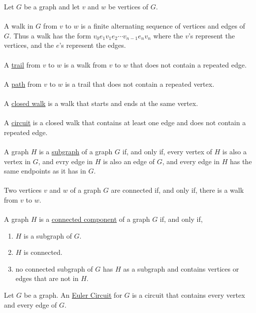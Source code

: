 \documentclass{report}
\begin{document}
Let $G$ be a graph and let $v$ and $w$ be vertices of $G$.\\\\
A walk in $G$ from $v$ to $w$ is a finite alternating sequence of vertices and edges of $G$. Thus a walk has the form $v_{0}e_{1}v_{1}e_{2}\cdots v_{n-1}e_{n}v_{n}$ where the $v$'s represent the vertices, and the $e$'s represent the edges.\\\\
A \underline{trail} from $v$ to $w$ is a walk from $v$ to $w$ that does not contain a repeated edge.\\\\
A \underline{path} from $v$ to $w$ is a trail that does not contain a repeated vertex.\\\\
A \underline{closed walk} is a walk that starts and ends at the same vertex.\\\\
A \underline{circuit} is a closed walk that contains at least one edge and does not contain a repeated edge.\\\\
A graph $H$ is a \underline{subgraph} of a graph $G$ if, and only if, every vertex of $H$ is also a vertex in $G$, and evry edge in $H$ is also an edge of $G$, and every edge in $H$ has the same endpoints as it has in $G$.\\\\
Two vertices $v$ and $w$ of a graph $G$ are connected if, and only if, there is a walk from $v$ to $w$.\\\\
A graph $H$ is a \underline{connected component} of a graph $G$ if, and only if,
\begin{enumerate}
    \item  $H$ is a subgraph of $G$.
    \item  $H$ is connected. 
    \item  no connected subgraph of $G$ has $H$ as a subgraph and contains vertices or edges that are not in $H$.
\end{enumerate}
Let $G$ be a graph. An \underline{Euler Circuit} for $G$ is a circuit that contains every vertex and every edge of $G$.
\end{document}
